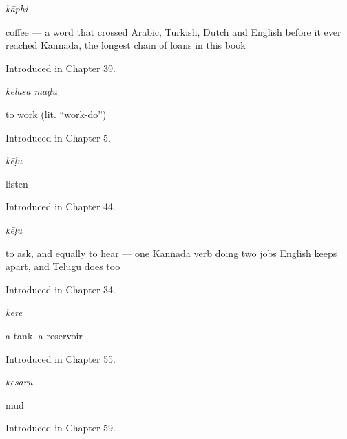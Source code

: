 \noindent\begin{minipage}[t]{\linewidth}
\raggedright
\textbf{}\enspace\emph{kāphi}\par
\small coffee — a word that crossed Arabic, Turkish, Dutch and English before it ever reached Kannada, the longest chain of loans in this book\par
\footnotesize Introduced in Chapter 39.
\end{minipage}\par\medskip

\noindent\begin{minipage}[t]{\linewidth}
\raggedright
\textbf{ }\enspace\emph{kelasa māḍu}\par
\small to work (lit. \textquotedblleft{}work-do\textquotedblright{})\par
\footnotesize Introduced in Chapter 5.
\end{minipage}\par\medskip

\noindent\begin{minipage}[t]{\linewidth}
\raggedright
\textbf{}\enspace\emph{kēḷu}\par
\small listen\par
\footnotesize Introduced in Chapter 44.
\end{minipage}\par\medskip

\noindent\begin{minipage}[t]{\linewidth}
\raggedright
\textbf{}\enspace\emph{kēḷu}\par
\small to ask, and equally to hear — one Kannada verb doing two jobs English keeps apart, and Telugu does too\par
\footnotesize Introduced in Chapter 34.
\end{minipage}\par\medskip

\noindent\begin{minipage}[t]{\linewidth}
\raggedright
\textbf{}\enspace\emph{kere}\par
\small a tank, a reservoir\par
\footnotesize Introduced in Chapter 55.
\end{minipage}\par\medskip

\noindent\begin{minipage}[t]{\linewidth}
\raggedright
\textbf{}\enspace\emph{kesaru}\par
\small mud\par
\footnotesize Introduced in Chapter 59.
\end{minipage}\par\medskip


